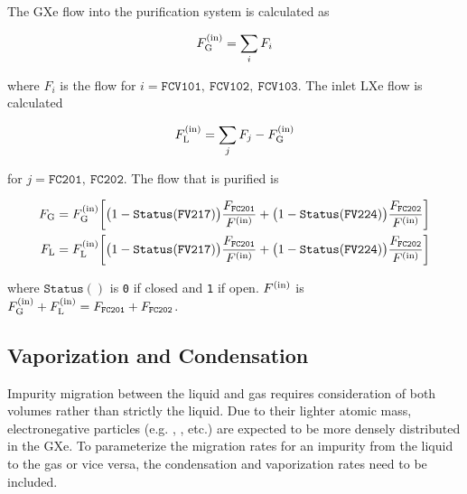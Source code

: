The GXe flow into the purification system is calculated as

\vspace{-10pt}

\begin{equation}
F_{\mathrm{G}}^{(\mathrm{in})} = \sum_i F_i
\end{equation}

\noindent where $F_i$ is the flow for $i = \mathtt{FCV101,\ FCV102,\ FCV103}$.  The inlet LXe flow is calculated

\vspace{-10pt}

\begin{equation}
F_{\mathrm{L}}^{(\mathrm{in})} = \sum_j F_j - F_{\mathrm{G}}^{(\mathrm{in})}
\end{equation}

\noindent for $j = \mathtt{FC201,\ FC202}$.  The flow that is purified is

\vspace{-20pt}

\begin{subequations}
\begin{align}
F_{\mathrm{G}} &= F_{\mathrm{G}}^{(\mathrm{in})} \bigg[ \big(1 - \mathtt{Status(FV217)}\big) \frac{F_{\mathtt{FC201}}}{F^{(\mathrm{in})}} +
\big(1 - \mathtt{Status(FV224)}\big) \frac{F_{\mathtt{FC202}}}{F^{(\mathrm{in})}} \bigg]
\\
F_{\mathrm{L}} &= F_{\mathrm{L}}^{(\mathrm{in})} \bigg[ \big(1 - \mathtt{Status(FV217)}\big) \frac{F_{\mathtt{FC201}}}{F^{(\mathrm{in})}} +
\big(1 - \mathtt{Status(FV224)}\big) \frac{F_{\mathtt{FC202}}}{F^{(\mathrm{in})}} \bigg]
\end{align}
\end{subequations}

\noindent where $\mathtt{Status()}$ is \texttt{0} if closed and \texttt{1} if open.  $F^{(\mathrm{in})}$ is
$F_{\mathrm{G}}^{(\mathrm{in})} + F_{\mathrm{L}}^{(\mathrm{in})} = F_{\mathtt{FC201}} + F_{\mathtt{FC202}}$.



\subsection{Vaporization and Condensation}
\label{subsec:electron_lifetime_model_vap_and_cond}
Impurity migration between the liquid and gas requires consideration of both volumes rather than strictly the liquid.  Due to their lighter
atomic mass, electronegative particles (e.g. , , etc.) are expected to be more densely distributed in the GXe.  To
parameterize the migration rates for an impurity from the liquid to the gas or vice versa, the condensation and
vaporization rates need to be included.

